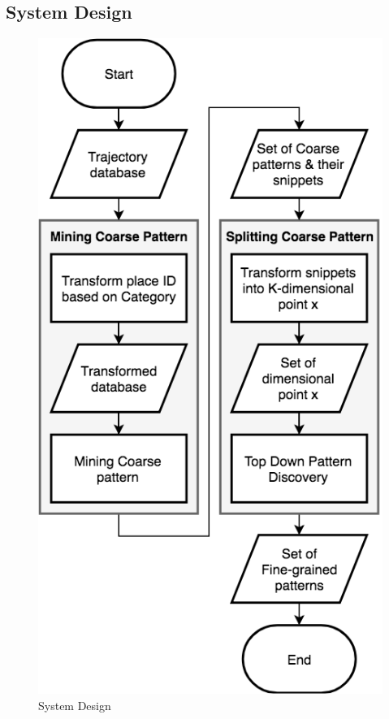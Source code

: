 \documentclass[conference]{IEEEtran}
\begin{document}
\subsection{System Design}
\begin{figure}[!ht]
\centering
\includegraphics[width=1\linewidth]{splitter}
\caption{System Design}
\label{fig:systemdesign}
\end{figure}
\end{document}
